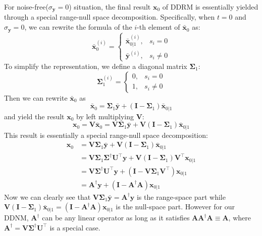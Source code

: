 \documentclass{article} \usepackage{iclr2023_conference,times}
\begin{document}
For noise-free($\sigma_{\mathbf{y}}=0$) situation, the final result $\mathbf{x}_{0}$ of DDRM is essentially yielded through a special range-null space decomposition. Specifically,  when $t=0$ and $\sigma_{\mathbf{y}}=0$, we can rewrite the formula of the $i$-th element of $\bar{\mathbf{x}}_0$ as:
\begin{equation}
    \bar{\mathbf{x}}_{0}^{(i)}=\begin{cases}\bar{\mathbf{x}}_{0|1}^{(i)}, & s_{i}=0\\
    \bar{\mathbf{y}}^{(i)}, & s_{i}\neq0\end{cases}
    \label{eq:lambda1}
\end{equation}
To simplify the representation, we define a diagonal matrix $\mathbf{\Sigma}_{1}$: 
\begin{equation}
    \mathbf{\Sigma}_{1}^{(i)}=\begin{cases}0, & s_{i}=0\\
    1, & s_{i}\neq0\end{cases}
    \label{eq:lambda2}
\end{equation}
Then we can rewrite $\bar{\mathbf{x}}_{0}$ as
\begin{equation}
    \bar{\mathbf{x}}_{0} =\mathbf{\Sigma}_{1}\bar{\mathbf{y}} + (\mathbf{I}-\mathbf{\Sigma}_{1})\bar{\mathbf{x}}_{0|1}
    \label{eq:ddrm3}
\end{equation}
and yield the result $\mathbf{x}_{0}$ by left multiplying $\mathbf{V}$:
\begin{equation}
    \mathbf{x}_{0} =\mathbf{V}\bar{\mathbf{x}}_{0}= \mathbf{V}\mathbf{\Sigma}_{1}\bar{\mathbf{y}} + \mathbf{V}(\mathbf{I}-\mathbf{\Sigma}_{1})\bar{\mathbf{x}}_{0|1}
    \label{eq:ddrm4}
\end{equation}
This result is essentially a special range-null space decomposition:
\begin{equation}
\begin{aligned}
    \mathbf{x}_{0} &= \mathbf{V}\mathbf{\Sigma}_{1}\bar{\mathbf{y}} + \mathbf{V}(\mathbf{I}-\mathbf{\Sigma}_{1})\bar{\mathbf{x}}_{0|1}\\
    &=\mathbf{V}\mathbf{\Sigma}_{1}\mathbf{\Sigma}^{\dagger}\mathbf{U}^{\top}\mathbf{y} + \mathbf{V}(\mathbf{I}-\mathbf{\Sigma}_{1})\mathbf{V}^{\top}\mathbf{x}_{0|1}\\
    &=\mathbf{V}\mathbf{\Sigma}^{\dagger}\mathbf{U}^{\top}\mathbf{y} + (\mathbf{I}-\mathbf{V}\mathbf{\Sigma}_{1}\mathbf{V}^{\top})\mathbf{x}_{0|1}\\
    &=\mathbf{A}^{\dagger}\mathbf{y} + (\mathbf{I}-\mathbf{A}^{\dagger}\mathbf{A})\mathbf{x}_{0|1}
    \label{eq:ddrm5}
\end{aligned}
\end{equation}
Now we can clearly see that $\mathbf{V}\mathbf{\Sigma}_{1}\bar{\mathbf{y}}=\mathbf{A}^{\dagger}\mathbf{y}$ is the range-space part while $\mathbf{V}(\mathbf{I}-\mathbf{\Sigma}_{1})\bar{\mathbf{x}}_{0|1}=(\mathbf{I}-\mathbf{A}^{\dagger}\mathbf{A})\mathbf{x}_{0|1}$ is the null-space part. However for our DDNM, $\mathbf{A}^{\dagger}$ can be any linear operator as long as it satisfies $\mathbf{A}\mathbf{A}^{\dagger}\mathbf{A}\equiv\mathbf{A}$, where $\mathbf{A}^{\dagger}=\mathbf{V}\mathbf{\Sigma}^{\dagger}\mathbf{U}^{\top}$ is a special case. 
\end{document}

